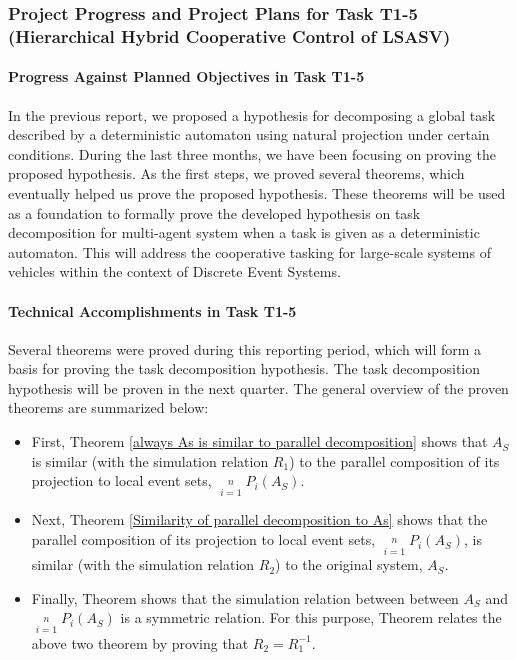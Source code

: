 \subsubsection{Project Progress and Project Plans for Task T1-5 (Hierarchical Hybrid Cooperative Control of LSASV)}
\paragraph{ Progress Against Planned Objectives in Task T1-5} In the previous report, we proposed a hypothesis for decomposing a global task described by a deterministic automaton using natural projection under certain conditions. During the last three months, we have been focusing on proving the proposed hypothesis. As the first steps, we proved several theorems, which eventually helped us prove the proposed hypothesis. These theorems will be used as a foundation to formally prove the developed hypothesis on task decomposition for multi-agent system when a task is given as a deterministic automaton. This will address the cooperative tasking for large-scale systems of vehicles within the context of Discrete Event Systems.

\paragraph{ Technical Accomplishments in Task T1-5 }
Several theorems were proved during this reporting period, which will form a basis for proving the task decomposition hypothesis. The task decomposition hypothesis will be proven in the next quarter. The general overview of the  proven theorems are summarized below: 

\begin{itemize}
  \item First, Theorem \ref{always As is similar to parallel decomposition} shows that $A_S$ is similar (with the simulation relation $R_1$) to the parallel composition of its projection to local event sets,
 $\mathop {||}\limits_{i = 1}^n P_i \left( {A_S }
\right)$. 
  \item Next, Theorem \ref{Similarity of parallel decomposition to As} shows that the parallel composition of its projection to local event sets, $\mathop {||}\limits_{i = 1}^n P_i \left( {A_S }
\right)$,  is similar (with the simulation relation $R_2$) to the original system, $A_S$.
  \item Finally, Theorem \label{symmetric} shows that the simulation relation between between $A_S$ and $\mathop {||}\limits_{i = 1}^n P_i \left( {A_S }
\right)$ is a symmetric relation. For this purpose,  Theorem \label{symmetric} relates the above two theorem by proving that $R_2=R_1^{-1}$.
\end{itemize}


